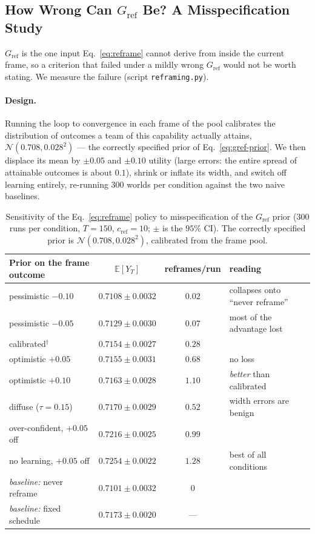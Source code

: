 \documentclass[11pt]{article}
\newcommand{\E}{\mathbb{E}}
\begin{document}
\subsection{How Wrong Can $G_{\text{ref}}$ Be? A Misspecification Study}
\label{sec:gref-sim}

$G_{\text{ref}}$ is the one input Eq.~\eqref{eq:reframe} cannot derive from inside the current frame, so a criterion that failed under a mildly wrong $G_{\text{ref}}$ would not be worth stating. We measure the failure (script \texttt{reframing.py}).

\paragraph{Design.} Running the loop to convergence in each frame of the pool calibrates the distribution of outcomes a team of this capability actually attains, $\mathcal N(0.708,0.028^2)$ --- the correctly specified prior of Eq.~\eqref{eq:gref-prior}. We then displace its mean by $\pm0.05$ and $\pm0.10$ utility (large errors: the entire spread of attainable outcomes is about $0.1$), shrink or inflate its width, and switch off learning entirely, re-running $300$ worlds per condition against the two naive baselines.

\begin{table}[h!]
\centering
\caption{Sensitivity of the Eq.~\eqref{eq:reframe} policy to misspecification of the $G_{\text{ref}}$ prior ($300$ runs per condition, $T=150$, $c_{\text{ref}}=10$; $\pm$ is the $95\%$ CI). The correctly specified prior is $\mathcal N(0.708,0.028^2)$, calibrated from the frame pool.}
\label{tab:gref}
\footnotesize
\begin{tabular}{@{}lccl@{}}
\toprule
\textbf{Prior on the frame outcome} & $\E[Y_T]$ & \textbf{reframes/run} & \textbf{reading} \\
\midrule
pessimistic $-0.10$        & $0.7108\pm0.0032$ & $0.02$ & collapses onto ``never reframe'' \\
pessimistic $-0.05$        & $0.7129\pm0.0030$ & $0.07$ & most of the advantage lost \\
calibrated$^\dagger$       & $0.7154\pm0.0027$ & $0.28$ & \\
optimistic $+0.05$         & $0.7155\pm0.0031$ & $0.68$ & no loss \\
optimistic $+0.10$         & $0.7163\pm0.0028$ & $1.10$ & \emph{better} than calibrated \\
\midrule
diffuse ($\tau=0.15$)      & $0.7170\pm0.0029$ & $0.52$ & width errors are benign \\
over-confident, $+0.05$ off& $0.7216\pm0.0025$ & $0.99$ & \\
no learning, $+0.05$ off   & $0.7254\pm0.0022$ & $1.28$ & best of all conditions \\
\midrule
\textit{baseline:} never reframe   & $0.7101\pm0.0032$ & $0$ & \\
\textit{baseline:} fixed schedule  & $0.7173\pm0.0020$ & --- & \\
\bottomrule
\end{tabular}
\end{table}
\end{document}
